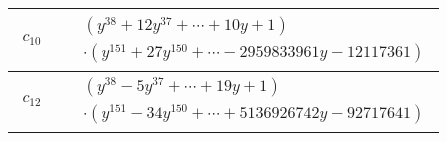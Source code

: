 \documentclass[1p]{elsarticle_modified}
\theoremstyle{definition}
\begin{document}
\begin{tabular}{m{50pt}|m{274pt}}
\hline $$\begin{aligned}c_{10}\end{aligned}$$&$\begin{aligned}
&(y^{38}+12 y^{37}+\cdots+10 y+1)\\
&\cdot(y^{151}+27 y^{150}+\cdots-2959833961 y-12117361)
\end{aligned}$\\
\hline $$\begin{aligned}c_{12}\end{aligned}$$&$\begin{aligned}
&(y^{38}-5 y^{37}+\cdots+19 y+1)\\
&\cdot(y^{151}-34 y^{150}+\cdots+5136926742 y-92717641)
\end{aligned}$\\
\hline
\end{tabular}
\vskip 2pc
\end{document}
